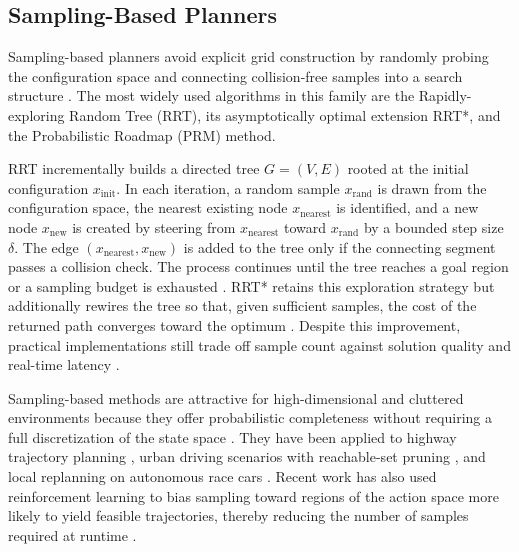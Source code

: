 \subsection{Sampling-Based Planners}
\label{subsection:SamplingBased}

Sampling-based planners avoid explicit grid construction by randomly probing the configuration space and connecting collision-free samples into a search structure \cite{orthey_SamplingBasedMotionPlanning_2023, gonzalez_ReviewMotionPlanning_2016}.
The most widely used algorithms in this family are the Rapidly-exploring Random Tree (RRT), its asymptotically optimal extension RRT*, and the Probabilistic Roadmap (PRM) method.

RRT incrementally builds a directed tree $G = (V, E)$ rooted at the initial configuration $x_{\text{init}}$.
In each iteration, a random sample $x_{\text{rand}}$ is drawn from the configuration space, the nearest existing node $x_{\text{nearest}}$ is identified, and a new node $x_{\text{new}}$ is created by steering from $x_{\text{nearest}}$ toward $x_{\text{rand}}$ by a bounded step size $\delta$.
The edge $(x_{\text{nearest}}, x_{\text{new}})$ is added to the tree only if the connecting segment passes a collision check.
The process continues until the tree reaches a goal region or a sampling budget is exhausted \cite{orthey_SamplingBasedMotionPlanning_2023}.
RRT* retains this exploration strategy but additionally rewires the tree so that, given sufficient samples, the cost of the returned path converges toward the optimum \cite{karaman_SamplingBasedAlgorithmsOptimal_2011}.
Despite this improvement, practical implementations still trade off sample count against solution quality and real-time latency \cite{orthey_SamplingBasedMotionPlanning_2023, wursching_SamplingBasedOptimalTrajectory_2021}.

Sampling-based methods are attractive for high-dimensional and cluttered environments because they offer probabilistic completeness without requiring a full discretization of the state space \cite{orthey_SamplingBasedMotionPlanning_2023, zhang_IntegratingAlgorithmicSamplingBased_2022}.
They have been applied to highway trajectory planning \cite{zhang_IntegratingAlgorithmicSamplingBased_2022}, urban driving scenarios with reachable-set pruning \cite{wursching_SamplingBasedOptimalTrajectory_2021, althoff_CommonRoadComposableBenchmarks_2017}, and local replanning on autonomous race cars \cite{ogretmen_local_2025, liniger_OptimizationBasedAutonomousRacing_2017}.
Recent work has also used reinforcement learning to bias sampling toward regions of the action space more likely to yield feasible trajectories, thereby reducing the number of samples required at runtime \cite{moller_LearningSampleReinforcement2025}.

